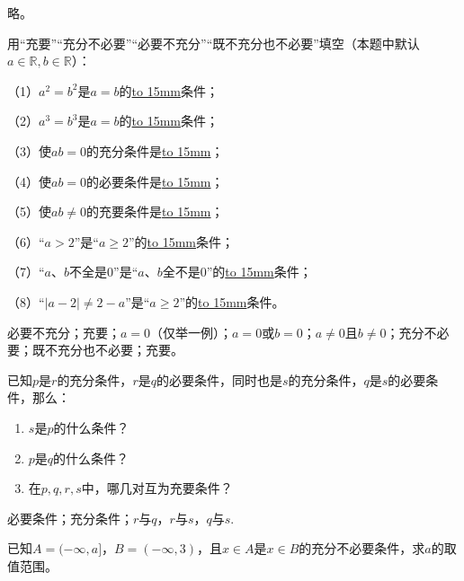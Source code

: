 \documentclass[lang=cn,newtx,10pt,scheme=chinese]{elegantbook}
\begin{document}
\begin{solution}
  略。
\end{solution}
\begin{exercise}\label{BJ4Z_Algebra1_P28.2}
  用“充要”“充分不必要”“必要不充分”“既不充分也不必要”填空（本题中默认$a\in\mathbb{R},b\in\mathbb{R}$）：

  （1）$a^2=b^2$是$a=b$的\underline{\hbox to 15mm{}}条件；

  （2）$a^3=b^3$是$a=b$的\underline{\hbox to 15mm{}}条件；

  （3）使$ab=0$的充分条件是\underline{\hbox to 15mm{}}；

  （4）使$ab=0$的必要条件是\underline{\hbox to 15mm{}}；

  （5）使$ab\neq 0$的充要条件是\underline{\hbox to 15mm{}}；

  （6）“$a>2$”是“$a\geqslant2$”的\underline{\hbox to 15mm{}}条件；

  （7）“$a、b$不全是0”是“$a、b$全不是0”的\underline{\hbox to 15mm{}}条件；

  （8）“$\vert a-2\vert\neq2-a$”是“$a\geqslant2$”的\underline{\hbox to 15mm{}}条件。
\end{exercise}
\begin{solution}
  必要不充分；充要；$a=0$（仅举一例）；$a=0$或$b=0$；$a\neq 0$且$b\neq 0$；充分不必要；既不充分也不必要；充要。
\end{solution}

\begin{exercise}\label{2017_XJ_bx1_P23.8}
  已知$p$是$r$的充分条件，$r$是$q$的必要条件，同时也是$s$的充分条件，$q$是$s$的必要条件，那么：
\end{exercise}

\begin{enumerate}
  \item $s$是$p$的什么条件？
  \item $p$是$q$的什么条件？
  \item 在$p,q,r,s$中，哪几对互为充要条件？
\end{enumerate}

\begin{solution}
  必要条件；充分条件；$r$与$q$，$r$与$s$，$q$与$s$.
\end{solution}

\begin{exercise}\label{2017_RJB_bx1_P36.B5}
  已知$A=(-\infty,a]$，$B=(-\infty,3)$，且$x\in A$是$x\in B$的充分不必要条件，求$a$的取值范围。
\end{exercise}
\end{document}
